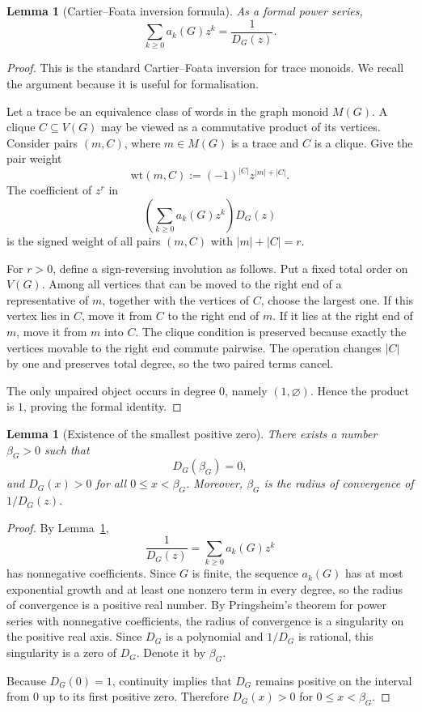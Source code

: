 \documentclass[11pt]{article}
\newtheorem{lemma}[theorem]{Lemma}
\newcommand{\V}{V}
\begin{document}
\begin{lemma}[Cartier--Foata inversion formula]
\label{lem:cartier-foata}
As a formal power series,
\[
        \sum_{k\ge 0}a_k(G)z^k
        =
        \frac{1}{D_G(z)}.
\]
\end{lemma}

\begin{proof}
This is the standard Cartier--Foata inversion for trace monoids.  We recall the
argument because it is useful for formalisation.

Let a trace be an equivalence class of words in the graph monoid \(M(G)\).  A clique
\(C\subseteq \V(G)\) may be viewed as a commutative product of its vertices.  Consider
pairs \((m,C)\), where \(m\in M(G)\) is a trace and \(C\) is a clique.  Give the pair
weight
\[
        \mathrm{wt}(m,C):=(-1)^{|C|}z^{|m|+|C|}.
\]
The coefficient of \(z^r\) in
\[
        \left(\sum_{k\ge 0}a_k(G)z^k\right)D_G(z)
\]
is the signed weight of all pairs \((m,C)\) with \(|m|+|C|=r\).

For \(r>0\), define a sign-reversing involution as follows.  Put a fixed total order
on \(\V(G)\).  Among all vertices that can be moved to the right end of a representative
of \(m\), together with the vertices of \(C\), choose the largest one.  If this vertex lies
in \(C\), move it from \(C\) to the right end of \(m\).  If it lies at the right end of \(m\),
move it from \(m\) into \(C\).  The clique condition is preserved because exactly the
vertices movable to the right end commute pairwise.  The operation changes \(|C|\) by
one and preserves total degree, so the two paired terms cancel.

The only unpaired object occurs in degree \(0\), namely \((1,\varnothing)\).  Hence the
product is \(1\), proving the formal identity.
\end{proof}

\begin{lemma}[Existence of the smallest positive zero]
\label{lem:smallest-positive-zero}
There exists a number \(\beta_G>0\) such that
\[
        D_G(\beta_G)=0,
\]
and \(D_G(x)>0\) for all \(0\le x<\beta_G\).  Moreover, \(\beta_G\) is the radius of
convergence of \(1/D_G(z)\).
\end{lemma}

\begin{proof}
By Lemma~\ref{lem:cartier-foata},
\[
        \frac{1}{D_G(z)}=\sum_{k\ge 0}a_k(G)z^k
\]
has nonnegative coefficients.  Since \(G\) is finite, the sequence \(a_k(G)\) has at
most exponential growth and at least one nonzero term in every degree, so the radius
of convergence is a positive real number.  By Pringsheim's theorem for power series
with nonnegative coefficients, the radius of convergence is a singularity on the positive
real axis.  Since \(D_G\) is a polynomial and \(1/D_G\) is rational, this singularity is a
zero of \(D_G\).  Denote it by \(\beta_G\).

Because \(D_G(0)=1\), continuity implies that \(D_G\) remains positive on the interval
from \(0\) up to its first positive zero.  Therefore \(D_G(x)>0\) for \(0\le x<\beta_G\).
\end{proof}
\end{document}
